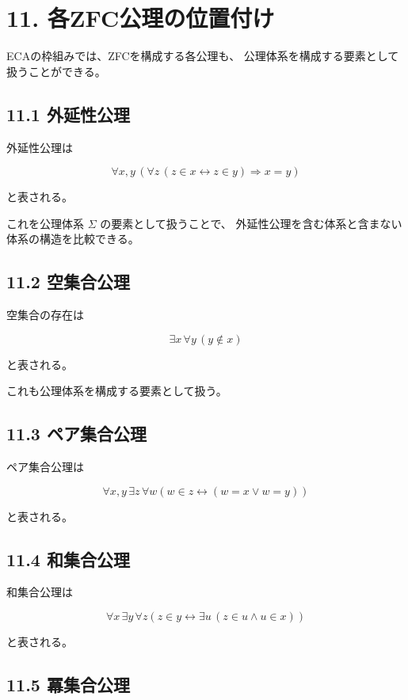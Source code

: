 \documentclass[11pt]{article}
\begin{document}
\section{11. 各ZFC公理の位置付け}

ECAの枠組みでは、ZFCを構成する各公理も、
公理体系を構成する要素として扱うことができる。

\subsection{11.1 外延性公理}

外延性公理は

\[
\forall x,y\,
\left(
\forall z\,(z\in x\leftrightarrow z\in y)
\Rightarrow x=y
\right)
\]

と表される。

これを公理体系 $\Sigma$ の要素として扱うことで、
外延性公理を含む体系と含まない体系の構造を比較できる。

\subsection{11.2 空集合公理}

空集合の存在は

\[
\exists x\,\forall y\,(y\notin x)
\]

と表される。

これも公理体系を構成する要素として扱う。

\subsection{11.3 ペア集合公理}

ペア集合公理は

\[
\forall x,y\,\exists z\,\forall w
\left(
w\in z\leftrightarrow(w=x\lor w=y)
\right)
\]

と表される。

\subsection{11.4 和集合公理}

和集合公理は

\[
\forall x\,\exists y\,\forall z
\left(
z\in y\leftrightarrow
\exists u\,(z\in u\land u\in x)
\right)
\]

と表される。

\subsection{11.5 冪集合公理}
\end{document}
